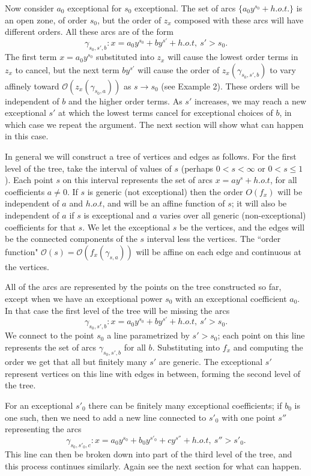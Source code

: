 \documentclass[article]{amsart}
\newcommand{\0}{{\bf 0}}
\begin{document}
Now consider $a_0$ exceptional for $s_0$ exceptional.  The set of arcs $\{ a_0y^{s_0} + h.o.t.\}$ is an open zone, of order $s_0$, but the order of $z_x$ composed with these arcs will have different orders.  All these arcs are of the form
$$\gamma_{s_0,s',b}: x = a_0y^{s_0} + by^{s'} + h.o.t, \ s'> s_0.$$
The first term $x=a_0y^{s_0}$ substituted into $z_x$ will cause the lowest order terms in $z_x$ to cancel, but the next term $by^{s'}$ will cause the order of $z_x (\gamma_{s_0,s',b})$ to vary affinely toward $\mathcal{O}(z_x(\gamma_{s_0,a}))$ as $s\rightarrow s_0$ (see Example 2).  These orders will be independent of $b$ and the higher order terms.  As $s'$ increases, we may 
reach a new exceptional $s'$ at which the lowest terms cancel for exceptional choices of $b$, in which case we repeat the argument.   The next section will show what can happen in this case.

In general we will construct a tree of vertices and edges as follows.  For the first level of the tree, take the interval of values of $s$ (perhaps $0<s<\infty$ or $0<s\le 1$).  Each point $s$ on this interval represents the set of arcs $x=ay^s + h.o.t$, for all coefficients $a\ne 0$.  If $s$ is generic (not exceptional) then the order $O(f_x)$ will be independent of $a$ and $h.o.t$, and will be an affine function of $s$; it will also be independent of $a$ if $s$ is exceptional and $a$ varies over all generic (non-exceptional) coefficients for that $s$.  We let the  exceptional $s$ be the vertices, and the edges will be the connected components of the $s$ interval less the vertices. The ``order function" 
$\mathcal{O} (s)=\mathcal{O}(f_x(\gamma_{s,a}))$ will be affine on each edge and continuous at the vertices.  

All of the arcs are represented by the points on the tree constructed so far, except when we have an exceptional power $s_0$ with an exceptional coefficient $a_0$.  In that case the first level of the tree will be missing the arcs
$$\gamma_{s_0,s',b}: x = a_0y^{s_0} + by^{s'} + h.o.t, \ s'> s_0.$$
We connect to the point $s_0$ a line parametrized by $s'>s_0$; each point on this line represents the set of arcs $\gamma_{s_0,s',b}$ for all $b$.  Substituting into $f_x$ and computing the order we get that all but finitely many $s'$ are generic. The exceptional $s'$ represent vertices on this line with edges in between, forming the second level of the tree. 

For an exceptional $s'_0$ there can be finitely many exceptional coefficients; if $b_0$ is one such, then we need to add a new line connected to $s'_0$ with one point $s''$ representing the arcs $$\gamma_{s_0,s'_0,c}: x = a_0y^{s_0} + b_0y^{s'_0} +cy^{s''}+ h.o.t, \ s''> s'_0.$$  This line can then be broken down into part of the third level of the tree, and this process continues similarly.  Again see the next section for what can happen.
\end{document}
